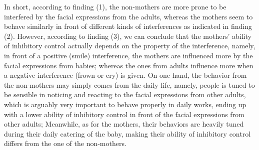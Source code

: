 In short, according to finding (1), 
the non-mothers are more prone to be interfered by the facial expressions
from the adults, whereas the mothers seem to behave similarly
in front of different kinds of interferences as indicated 
in finding (2). However, 
according to finding (3),
we can conclude that the mothers' ability of 
inhibitory control actually depends on the
property of the interference, namely,
in front of a positive (smile) interference,
the mothers are influenced more by the facial expressions from babies;
whereas the ones from adults influence more when a negative 
interference (frown or cry) is given.
On one hand, 
the behavior from the non-mothers may simply
comes from the daily life, namely, people is tuned
to be sensible in noticing and reacting to the facial expressions
from other adults,
which is arguably very important to behave properly
in daily works,
ending up with a lower ability of inhibitory control
in front of the facial expressions from other adults; 
Meanwhile, as for the mothers,
their behaviors are heavily tuned during their daily catering of 
the baby, making their ability of inhibitory control
differs from the one of the non-mothers.








